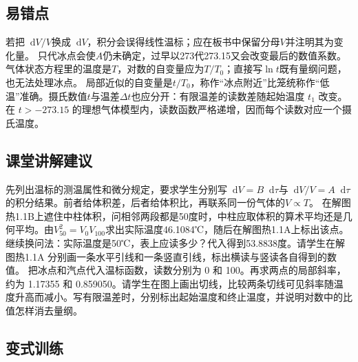 \documentclass[UTF8,fontset=fandol,a4paper,11pt]{ctexart}
\newcommand{\dd}{\mathop{}\!\mathrm{d}}
\begin{document}


\subsection*{易错点}

若把$\dd V/V$换成$\dd V$，积分会误得线性温标；应在板书中保留分母$V$并注明其为变化量。
只代冰点会使$A$仍未确定，过早以273代273.15又会改变最后的数值系数。气体状态方程里的温度是$T$，对数的自变量应为$T/T_0$；直接写$\ln t$既有量纲问题，也无法处理冰点。
局部近似的自变量是$t/T_0$，称作“冰点附近”比笼统称作“低温”准确。摄氏数值$t$与温差$\Delta t$也应分开：有限温差的读数差随起始温度 $t_1$ 改变。
在 $t>-273.15$ 的理想气体模型内，读数函数严格递增，因而每个读数对应一个摄氏温度。



\subsection*{课堂讲解建议}

先列出温标的测温属性和微分规定，要求学生分别写$\dd V=B\dd\tau$与$\dd V/V=A\dd\tau$的积分结果。前者给体积差，后者给体积比，再联系同一份气体的$V\propto T$。
在解图热1.1B上遮住中柱体积，问相邻两段都是50度时，中柱应取体积的算术平均还是几何平均。由$V_{50}^2=V_0V_{100}$求出实际温度46.1084℃，随后在解图热1.1A上标出该点。
继续换问法：实际温度是50℃，表上应读多少？代入得到53.8838度。请学生在解图热1.1A 分别画一条水平引线和一条竖直引线，标出横读与竖读各自得到的数值。
把冰点和汽点代入温标函数，读数分别为 0 和 100。再求两点的局部斜率，约为 1.17355 和 0.859050。请学生在图上画出切线，比较两条切线可见斜率随温度升高而减小。写有限温差时，分别标出起始温度和终止温度，并说明对数中的比值怎样消去量纲。




\subsection*{变式训练}
\end{document}
